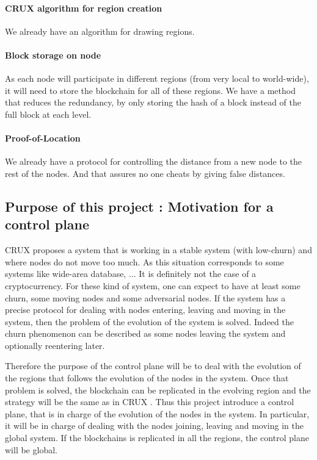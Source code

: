\documentclass[a4paper,11pt,oneside]{report}
\begin{document}
\paragraph{CRUX algorithm for region creation} 
We already have an algorithm for drawing regions.

\paragraph{Block storage on node} As each node will participate in
different regions (from very local to world-wide), it will need to store the
blockchain for all of these regions. We have a method that reduces the
redundancy, by only storing the hash of a block instead of the full block at
each level. 

\paragraph{Proof-of-Location} We already have a protocol for controlling
the distance from a new node to the rest of the nodes. And that assures no one
cheats by giving false distances. 

\subsection{Purpose of this project : Motivation for a control plane}

CRUX \cite{Basescu2014} proposes a system that is working in a stable system
(with low-churn) and where nodes do not move too much. As this situation
corresponds to some systems like wide-area database, ... It is definitely not
the case of a cryptocurrency.  For these kind of system, one can expect to have
at least some churn, some moving nodes and some adversarial nodes.  If the
system has a precise protocol for dealing with nodes entering, leaving and
moving in the system, then the problem of the evolution of the system is
solved. Indeed the churn phenomenon can be described as some nodes leaving the
system and optionally reentering later. 

Therefore the purpose of the control plane will be to deal with the evolution
of the regions that follows the evolution of the nodes in the system. Once that
problem is solved, the blockchain can be replicated in the evolving region and
the strategy will be the same as in CRUX \cite{Basescu2014}. Thus this project
introduce a control plane, that is in charge of the evolution of the nodes in
the system. In particular, it will be in charge of dealing with the nodes
joining, leaving and moving in the global system. If the blockchains is
replicated in all the regions, the control plane will be global. 
\end{document}
